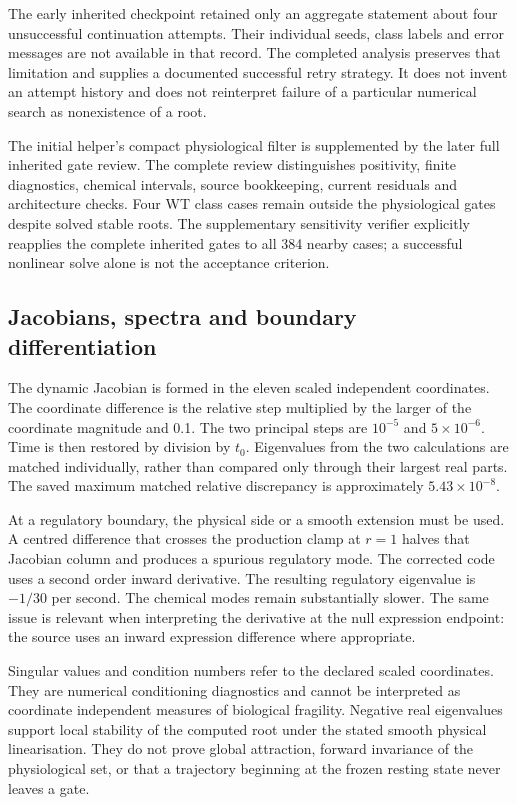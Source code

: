 The early inherited checkpoint retained only an aggregate statement about four unsuccessful continuation attempts. Their individual seeds, class labels and error messages are not available in that record. The completed analysis preserves that limitation and supplies a documented successful retry strategy. It does not invent an attempt history and does not reinterpret failure of a particular numerical search as nonexistence of a root.

The initial helper's compact physiological filter is supplemented by the later full inherited gate review. The complete review distinguishes positivity, finite diagnostics, chemical intervals, source bookkeeping, current residuals and architecture checks. Four WT class cases remain outside the physiological gates despite solved stable roots. The supplementary sensitivity verifier explicitly reapplies the complete inherited gates to all 384 nearby cases; a successful nonlinear solve alone is not the acceptance criterion.

\subsection{Jacobians, spectra and boundary differentiation}
The dynamic Jacobian is formed in the eleven scaled independent coordinates. The coordinate difference is the relative step multiplied by the larger of the coordinate magnitude and 0.1. The two principal steps are $10^{-5}$ and $5\times10^{-6}$. Time is then restored by division by $t_0$. Eigenvalues from the two calculations are matched individually, rather than compared only through their largest real parts. The saved maximum matched relative discrepancy is approximately $5.43\times10^{-8}$.

At a regulatory boundary, the physical side or a smooth extension must be used. A centred difference that crosses the production clamp at $r=1$ halves that Jacobian column and produces a spurious regulatory mode. The corrected code uses a second order inward derivative. The resulting regulatory eigenvalue is $-1/30$ per second. The chemical modes remain substantially slower. The same issue is relevant when interpreting the derivative at the null expression endpoint: the source uses an inward expression difference where appropriate.

Singular values and condition numbers refer to the declared scaled coordinates. They are numerical conditioning diagnostics and cannot be interpreted as coordinate independent measures of biological fragility. Negative real eigenvalues support local stability of the computed root under the stated smooth physical linearisation. They do not prove global attraction, forward invariance of the physiological set, or that a trajectory beginning at the frozen resting state never leaves a gate.

